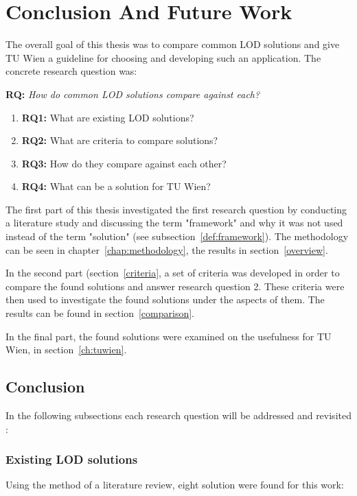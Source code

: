 \chapter{Conclusion And Future Work}\label{ch:summary}

The overall goal of this thesis was to compare common LOD solutions and give TU Wien a guideline for choosing and developing such an application. The concrete research question was: 

\textbf{RQ:} \textit{How do common LOD solutions compare against each?}
\begin{enumerate}
\item \textbf{RQ1:} What are existing LOD solutions?
\item \textbf{RQ2:} What are criteria to compare solutions?
\item \textbf{RQ3:} How do they compare against each other?
\item \textbf{RQ4:} What can be a solution for TU Wien?
\end{enumerate}

The first part of this thesis investigated the first research question by conducting a literature study and discussing the term "framework" and why it was not used instead of the term "solution" (see subsection~\ref{def:framework}). The methodology can be seen in chapter~\ref{chap:methodology}, the results in section~\ref{overview}.

In the second part (section~\ref{criteria}, a set of criteria was developed in order to compare the found solutions and answer research question 2. These criteria were then used to investigate the found solutions under the aspects of them. The results can be found in section~\ref{comparison}.

In the final part, the found solutions were examined on the usefulness for TU Wien, in section~\ref{ch:tuwien}.  

\section{Conclusion}

In the following subsections each research question will be addressed and revisited :

\subsection{Existing LOD solutions}

Using the method of a literature review, eight solution were found for this work: 

